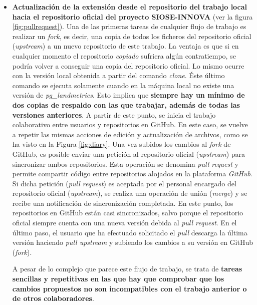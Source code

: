 \begin{itemize}
\item \textbf{Actualización de la extensión desde el repositorio del trabajo local hacia el repositorio oficial del proyecto SIOSE-INNOVA} (ver la figura \ref{fig:pullrequest}). Una de las primeras tareas de cualquier flujo de trabajo es realizar un \textit{fork}, es decir, una copia de todos los ficheros del repositorio oficial (\textit{upstream}) a un nuevo repositorio de este trabajo. La ventaja es que si en cualquier momento el repositorio \textit{copiado} sufriera algún contratiempo, se podría volver a conseguir una copia del repositorio oficial. Lo mismo ocurre con la versión local obtenida a partir del comando \textit{clone}. Éste último comando se ejecuta solamente cuando en la máquina local no existe una versión de \textit{pg\_landmetrics}. Esto implica que \textbf{siempre hay un mínimo de dos copias de respaldo con las que trabajar, además de todas las versiones anteriores}. A partir de este punto, se inicia el trabajo colaborativo entre usuarios y repositorios en GitHub. En este caso, se vuelve a repetir las mismas acciones de edición y actualización de archivos, como se ha visto en la Figura \ref{fig:diary}. Una vez subidos los cambios al \textit{fork} de GitHub, es posible enviar una petición al repositorio oficial (\textit{upstream}) para sincronizar ambos repositorios. Esta operación se denomina \textit{pull request} y permite compartir código entre repositorios alojados en la plataforma \textit{GitHub}. Si dicha petición (\textit{pull request}) es aceptada por el personal encargado del repositorio oficial (\textit{upstream}), se realiza una operación de unión (\textit{merge}) y se recibe una notificación de sincronización completada. En este punto, los repositorios en GitHub están casi sincronizados, salvo porque el repositorio oficial siempre cuenta con una nueva versión debida al \textit{pull request}. En el último paso, el usuario que ha efectuado solicitado el \textit{pull} descarga la última versión haciendo \textit{pull upstream} y subiendo los cambios a su versión en GitHub (\textit{fork}).

A pesar de lo complejo que parece este flujo de trabajo, se trata de \textbf{tareas sencillas y repetitivas en las que hay que comprobar que los cambios propuestos no son incompatibles con el trabajo anterior o de otros colaboradores}.


\end{itemize}

